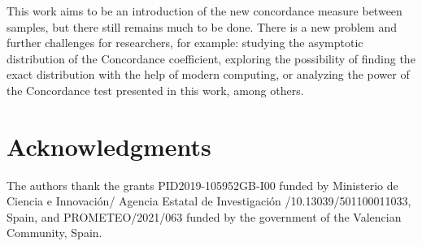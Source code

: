 This work  aims to be an introduction of the new concordance measure between samples, but there still remains much to be done. There is a new problem and further challenges for researchers, for example: studying the asymptotic distribution of the Concordance coefficient, exploring the possibility of finding the exact distribution with the help of modern computing, or analyzing the power of the Concordance test presented in this work, among others.

\section{Acknowledgments}

The authors thank the grants PID2019-105952GB-I00 funded by Ministerio de Ciencia e Innovación/ Agencia Estatal de Investigación /10.13039/501100011033, Spain, and PROMETEO/2021/063 funded by the government of the Valencian Community, Spain.





\newpage

